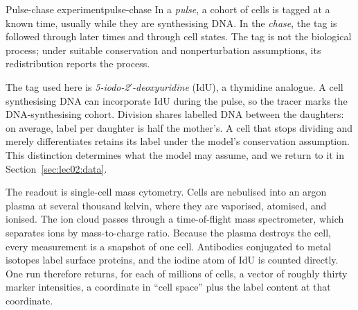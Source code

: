 \begin{definition}{Pulse-chase experiment}{pulse-chase}
In a \emph{pulse}, a cohort of cells is tagged at a known time, usually while they are synthesising DNA. In the \emph{chase}, the tag is followed through later times and through cell states. The tag is not the biological process; under suitable conservation and nonperturbation assumptions, its redistribution reports the process.
\end{definition}

The tag used here is \emph{5-iodo-2$'$-deoxyuridine} (IdU), a thymidine analogue. A cell synthesising DNA can incorporate IdU during the pulse, so the tracer marks the DNA-synthesising cohort. Division shares labelled DNA between the daughters: on average, label per daughter is half the mother's. A cell that stops dividing and merely differentiates retains its label under the model's conservation assumption. This distinction determines what the model may assume, and we return to it in Section~\ref{sec:lec02:data}.

The readout is single-cell mass cytometry. Cells are nebulised into an argon plasma at several thousand kelvin, where they are vaporised, atomised, and ionised. The ion cloud passes through a time-of-flight mass spectrometer, which separates ions by mass-to-charge ratio. Because the plasma destroys the cell, every measurement is a snapshot of one cell. Antibodies conjugated to metal isotopes label surface proteins, and the iodine atom of IdU is counted directly. One run therefore returns, for each of millions of cells, a vector of roughly thirty marker intensities, a coordinate in ``cell space'' plus the label content at that coordinate.

